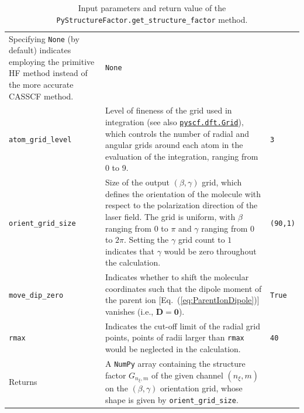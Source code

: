 \documentclass[preprint,12pt]{elsarticle} %
\newcommand{\bn}[1]{\mathbf{#1}}    %
\begin{document}
\begin{table}[tb]
\begin{tabular}{l p{9cm} l}
                                      Specifying \texttt{None} (by default) indicates employing the primitive HF method instead of the more accurate CASSCF method.
                                                                                                                                                & \texttt{None}\\
        \texttt{atom\_grid\_level}  & Level of fineness of the grid used in integration
                                      (see also \href{https://pyscf.org/pyscf_api_docs/pyscf.dft.html#module-pyscf.dft.gen_grid}{\texttt{pyscf.dft.Grid}}),
                                      which controls the number of radial and angular grids around each atom in the evaluation of the integration,
                                      ranging from 0 to 9.
                                                                                                                                                & \texttt{3}        \\
        \texttt{orient\_grid\_size} & Size of the output $(\beta,\gamma)$ grid, which defines the orientation of the molecule with respect to the polarization direction of the laser field.
                                      The grid is uniform, with $\beta$ ranging from $0$ to $\pi$ and $\gamma$ ranging from $0$ to $2\pi$.
                                      Setting the $\gamma$ grid count to $1$ indicates that $\gamma$ would be zero throughout the calculation.
                                                                                                                                                & \texttt{(90,1)}   \\
        \texttt{move\_dip\_zero}    & Indicates whether to shift the molecular coordinates such that the dipole moment of the parent ion [Eq.~(\ref{eq:ParentIonDipole})] vanishes
                                      (i.e., $\bn{D}=\bn{0}$).
                                                                                                                                                & \texttt{True}     \\
        \texttt{rmax}               & Indicates the cut-off limit of the radial grid points,
                                      points of radii larger than \texttt{rmax} would be neglected in the calculation.
                                                                                                                                                & \texttt{40}       \\
        \hline
        Returns                     & A \texttt{NumPy} array containing the structure factor $G_{n_\xi,m}$ of the given channel $(n_\xi,m)$
                                      on the $(\beta,\gamma)$ orientation grid, whose shape is given by \texttt{orient\_grid\_size}. \\
        \hline \hline
    \end{tabular}
    \caption{Input parameters and return value of the \texttt{PyStructureFactor.get\_structure\_factor} method.}
    \label{tab:getsf_param}
\end{table}
\end{document}
